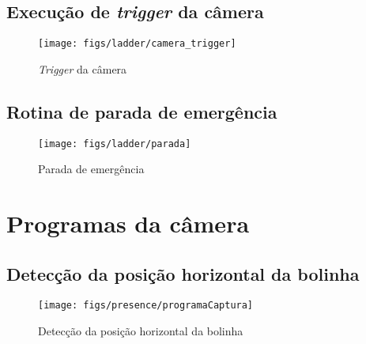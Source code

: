 \subsection{Execução de \textit{trigger} da câmera}
\label{laddertrigger}
\begin{figure}[!ht]
\centering
\texttt{[image: figs/ladder/camera\_trigger]}
\caption{\textit{Trigger} da câmera}
\end{figure}

\subsection{Rotina de parada de emergência}
\label{emergencyladder}
\begin{figure}[!ht]
\centering
\texttt{[image: figs/ladder/parada]}
\caption{Parada de emergência}
\end{figure}

\section{Programas da câmera}
\subsection{Detecção da posição horizontal da bolinha}
\label{ballhorzpos}
\begin{figure}[!ht]
\centering
\texttt{[image: figs/presence/programaCaptura]}
\caption{Detecção da posição horizontal da bolinha}
\end{figure}